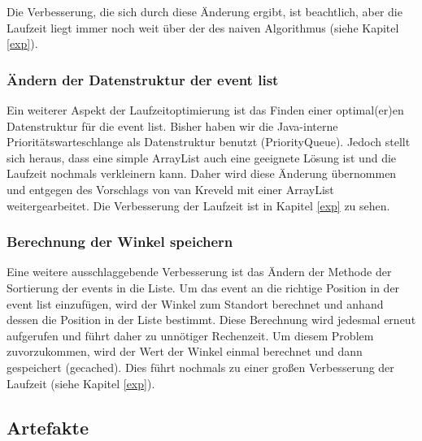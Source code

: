 Die Verbesserung, die sich durch diese Änderung ergibt, ist beachtlich, aber die Laufzeit liegt immer noch weit über der des naiven Algorithmus 
(siehe Kapitel \ref{exp}).

\subsubsection{Ändern der Datenstruktur der event list}

Ein weiterer Aspekt der Laufzeitoptimierung ist das Finden einer optimal(er)en Datenstruktur für die event list. Bisher haben wir die Java-interne 
Prioritätswarteschlange als Datenstruktur benutzt (PriorityQueue). Jedoch stellt sich heraus, dass eine simple ArrayList auch eine geeignete Lösung
ist und die Laufzeit nochmals verkleinern kann. Daher wird diese Änderung übernommen und entgegen des Vorschlags von van Kreveld mit einer ArrayList
weitergearbeitet. Die Verbesserung der Laufzeit ist in Kapitel \ref{exp} zu sehen.

\subsubsection{Berechnung der Winkel speichern}

Eine weitere ausschlaggebende Verbesserung ist das Ändern der Methode der Sortierung der events in die Liste. Um das event an die richtige Position 
in der event list einzufügen, wird der Winkel zum Standort berechnet und anhand dessen die Position in der Liste bestimmt. Diese Berechnung wird 
jedesmal erneut aufgerufen und führt daher zu unnötiger Rechenzeit. Um diesem Problem zuvorzukommen, wird der Wert der Winkel einmal berechnet und 
dann gespeichert (\glqq gecached\grqq). Dies führt nochmals zu einer großen Verbesserung der Laufzeit (siehe Kapitel \ref{exp}).

\subsection{Artefakte}

